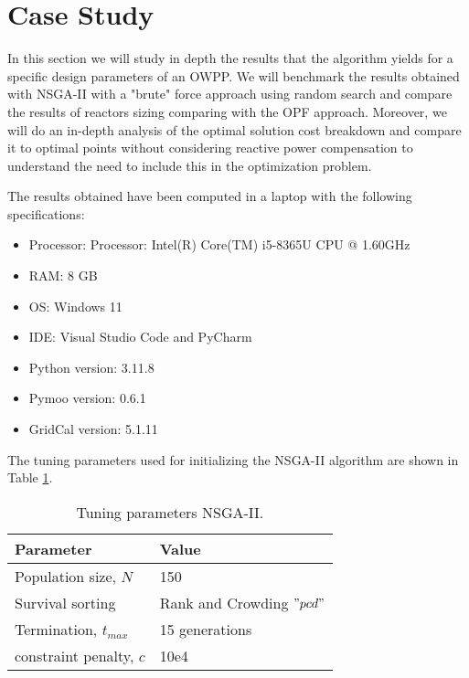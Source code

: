 \documentclass[a4paper,11pt, titlepage, twoside]{article}
\begin{document}
\section{Case Study}\label{CaseStudies}

In this section we will study in depth the results that the algorithm yields for a specific design parameters
of an OWPP. We will benchmark the results obtained with NSGA-II with a "brute" force approach using random search and compare the results of reactors sizing comparing with the OPF
approach. Moreover, we will do an in-depth analysis of the optimal solution cost breakdown and compare it to optimal points without considering reactive power compensation to understand the need
to include this in the optimization problem.



The results obtained have been computed in a laptop with the following specifications:
\begin{itemize}
    \item Processor: Processor: Intel(R) Core(TM) i5-8365U CPU @ 1.60GHz
    \item RAM: 8 GB
    \item OS: Windows 11
    \item IDE: Visual Studio Code and PyCharm
    \item Python version: 3.11.8
    \item Pymoo version: 0.6.1
    \item GridCal version: 5.1.11
\end{itemize}

The tuning parameters used for initializing the NSGA-II algorithm are shown in Table \ref{tab:NSGAII_parameters}.

\begin{table}[h]
\centering
    \begin{tabular}{l|l}
    \hline
    \textbf{Parameter} & \textbf{Value} \\ \hline
    Population size, $N$ & 150 \\ \hline
    Survival sorting & Rank and Crowding $"pcd"$ \\ \hline
    Termination, $t_{max}$  & 15 generations \\ \hline
    constraint penalty, $c$ & 10e4 \\ \hline
    \end{tabular}
    \caption{Tuning parameters NSGA-II.}
    \label{tab:NSGAII_parameters}
\end{table}
\end{document}

